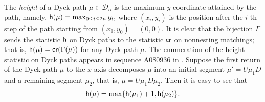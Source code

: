 \documentclass[11pt]{article}
\DeclareMathOperator{\h}{\mbox{\sf{h}}}
\DeclareMathOperator{\crr}{\mbox{\sf{cr}}}
\begin{document}
	The \emph{height} of a Dyck path \( \mu \in \mathcal{D}_n \) is the maximum \( y \)-coordinate attained by the path, namely, 
	\(
	\h(\mu) = \max_{0 \le i \le 2n} y_i,
	\)
	where \( (x_i, y_i) \) is the position after the \(i\)-th step of the path starting from \( (x_0, y_0) = (0, 0) \). 
	It is clear that the bijection $\Gamma$ sends the statistic $\h$ on Dyck paths to the statistic $\crr$ 
	on nonnesting matchings; that is, $\h(\mu)=\crr(\Gamma(\mu))$ for any Dyck path $\mu$. The enumeration of the height statistic on Dyck paths appears in sequence \textup{A080936} in \cite{OEIS}.
	Suppose the first return of the Dyck path $\mu$ to the $x$-axis decomposes $\mu$ into an initial segment $\mu'=U\mu_1D$ and a remaining segment $\mu_2$, that is, $\mu=U\mu_1D\mu_2$. Then it is easy to see that
	\begin{align}\label{formular-h(D)}
		\h(\mu) = \max\{\h(\mu_1) + 1, \h(\mu_2)\}.
	\end{align}
	
\end{document}
